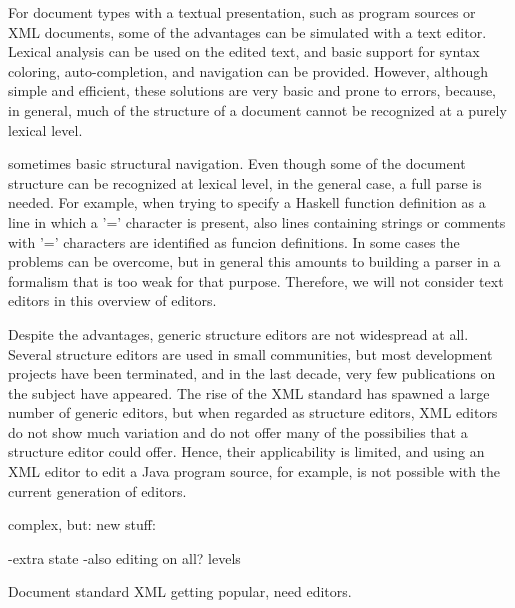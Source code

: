 For document types with a textual presentation, such as program sources or XML documents, some of the advantages can be simulated with a text editor. Lexical analysis can be used on the edited text, and basic support for syntax coloring, auto-completion, and navigation can be provided. However, although simple and efficient, these solutions are  very basic and prone to errors, because, in general, much of the structure of a document cannot be recognized at a purely lexical level.

\bc
sometimes basic structural navigation.  Even though some of the document structure can be recognized at lexical level, in the general case, a full parse is needed. For example, when trying to specify a Haskell function definition as a line in which a '=' character is present, also lines containing strings or comments with '=' characters are identified as funcion definitions. In some cases the problems can be overcome, but in general this amounts to building a parser in a formalism that is too weak for that purpose. Therefore, we will not consider text editors in this overview of editors.
\ec

Despite the advantages, generic structure editors are not widespread at all. Several structure editors are used in small communities, but most development projects have been terminated, and in the last decade, very few publications on the subject have appeared. The rise of the XML standard has spawned a large number of generic editors, but when regarded as structure editors, XML editors do not show much variation and do not offer many of the possibilies that a structure editor could offer. Hence, their applicability is limited, and using an XML editor to edit a Java program source, for example, is not possible with the current generation of editors.




%

\bc
complex, but:
new stuff:

-extra state
-also editing on all? levels

Document standard XML getting popular, need editors.

